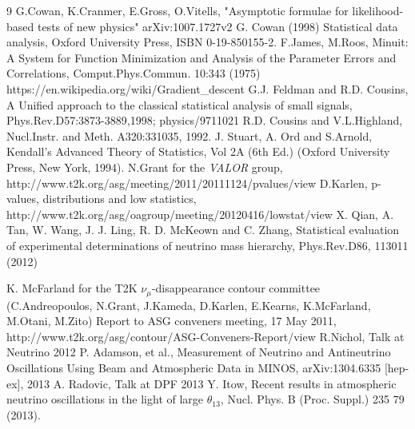 \begin{thebibliography}{9}
%
%
G.Cowan, K.Cranmer, E.Gross, O.Vitells,
"Asymptotic formulae for likelihood-based tests of new physics"
arXiv:1007.1727v2
  G. Cowan (1998) Statistical data analysis, 
  Oxford University Press, ISBN 0-19-850155-2.
  F.James, M.Roos, Minuit: A System for Function Minimization and Analysis of the 
  Parameter Errors and Correlations, Comput.Phys.Commun. 10:343 (1975)
https://en.wikipedia.org/wiki/Gradient\_descent
  G.J. Feldman and R.D. Cousins,
  A Unified approach to the classical statistical analysis of small signals,
  Phys.Rev.D57:3873-3889,1998; physics/9711021
  R.D. Cousins and V.L.Highland, 
  Nucl.Instr. and Meth. A320:331035, 1992.
J. Stuart, A. Ord and S.Arnold,
Kendall's Advanced Theory of Statistics, Vol 2A (6th Ed.) 
(Oxford University Press, New York, 1994).
 N.Grant for the {\em VALOR} group,
 http://www.t2k.org/asg/meeting/2011/20111124/pvalues/view
 D.Karlen,
 p-values, distributions and low statistics,
 http://www.t2k.org/asg/oagroup/meeting/20120416/lowstat/view
 X. Qian, A. Tan, W. Wang, J. J. Ling, R. D. McKeown and C. Zhang,
 Statistical evaluation of experimental determinations of neutrino mass hierarchy,
 Phys.Rev.D86, 113011 (2012)
 
%
%
  K. McFarland for the T2K $\nu_{\mu}$-disappearance contour committee 
  (C.Andreopoulos, N.Grant, J.Kameda, D.Karlen, E.Kearns, K.McFarland, M.Otani, M.Zito)
  Report to ASG conveners meeting, 17 May 2011,
  http://www.t2k.org/asg/contour/ASG-Conveners-Report/view
%
%
  R.Nichol,
  Talk at Neutrino 2012
  P. Adamson, et al.,
  Measurement of Neutrino and Antineutrino Oscillations Using Beam and Atmospheric Data in MINOS,
  arXiv:1304.6335 [hep-ex], 2013
  A. Radovic,
  Talk at DPF 2013
  Y. Itow,
  Recent results in atmospheric neutrino oscillations in the light of large $\theta_{13}$,
  Nucl. Phys. B (Proc. Suppl.) 235 79 (2013).


\end{thebibliography}
